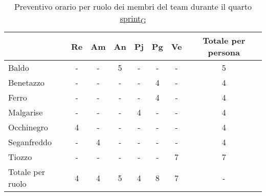 \begin{table}[!h]
	\centering
	\begin{tabular}{ | l | c | c | c | c | c | c | c | }
		\hline
		\textbf{}        & \textbf{Re} & \textbf{Am} & \textbf{An} & \textbf{Pj} & \textbf{Pg} & \textbf{Ve} & \textbf{Totale per persona} \\
		\hline
		Baldo            & -           & -           & 5           & -           & -           & -           & 5                           \\
		Benetazzo        & -           & -           & -           & -           & 4           & -           & 4                           \\
		Ferro            & -           & -           & -           & -           & 4           & -           & 4                           \\
		Malgarise        & -           & -           & -           & 4           & -           & -           & 4                           \\
		Occhinegro       & 4           & -           & -           & -           & -           & -           & 4                           \\
		Seganfreddo      & -           & 4           & -           & -           & -           & -           & 4                           \\
		Tiozzo           & -           & -           & -           & -           & -           & 7           & 7                           \\
		\hline
		Totale per ruolo & 4           & 4           & 5           & 4           & 8           & 7           & -                           \\
		\hline
	\end{tabular}
	\caption{Preventivo orario per ruolo dei membri del team durante il quarto \href{https://7last.github.io/docs/rtb/documentazione-interna/glossario\#sprint}{sprint\textsubscript{G}}}
	
\end{table}

